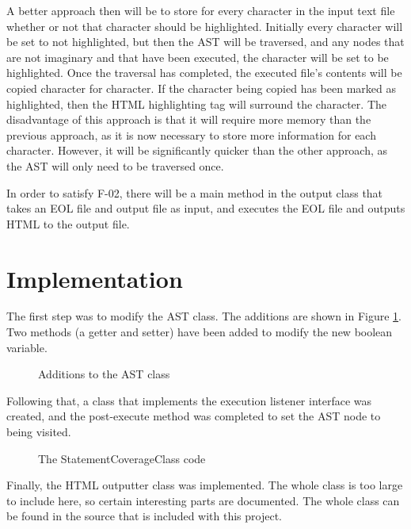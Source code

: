 A better approach then will be to store for every character in the input text file whether or not that character should be highlighted. Initially every character will be set to not highlighted, but then the AST will be traversed, and any nodes that are not imaginary and that have been executed, the character will be set to be highlighted. Once the traversal has completed, the executed file's contents will be copied character for character. If the character being copied has been marked as highlighted, then the HTML highlighting tag will surround the character. The disadvantage of this approach is that it will require more memory than the previous approach, as it is now necessary to store more information for each character. However, it will be significantly quicker than the other approach, as the AST will only need to be traversed once.

In order to satisfy F-02, there will be a main method in the output class that takes an EOL file and output file as input, and executes the EOL file and outputs HTML to the output file.

\section{Implementation}

The first step was to modify the AST class. The additions are shown in Figure \ref{lst:ASTStatementAdditions}. Two methods (a getter and setter) have been added to modify the new boolean variable.

\begin{figure}[h]
	
	\caption{Additions to the AST class}
	\label{lst:ASTStatementAdditions}
\end{figure}

Following that, a class that implements the execution listener interface was created, and the post-execute method was completed to set the AST node to being visited.

\begin{figure}[h]
	
	\caption{The StatementCoverageClass code}
	\label{lst:StatementCoverageListener}
\end{figure}

Finally, the HTML outputter class was implemented. The whole class is too large to include here, so certain interesting parts are documented. The whole class can be found in the source that is included with this project.

